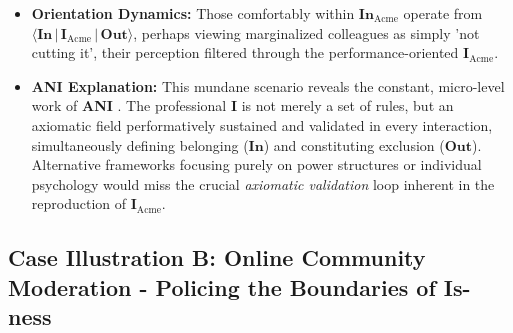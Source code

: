 \documentclass{article}
\newcommand{\ANI}{\textbf{ANI}}             %
\newcommand{\Isness}{\mathbf{I}}            %
\newcommand{\Inness}{\mathbf{In}}           %
\newcommand{\Outness}{\mathbf{Out}}         %
\newcommand{\orientation}[3]{\ensuremath{\langle #1 \,|\, #2 \,|\, #3 \rangle}} %
\begin{document}
\begin{itemize}
    \item \textbf{Orientation Dynamics:} Those comfortably within $\Inness_{\text{Acme}}$ operate from $\orientation{\Inness}{\Isness_{\text{Acme}}}{\Outness}$, perhaps viewing marginalized colleagues as simply 'not cutting it', their perception filtered through the performance-oriented $\Isness_{\text{Acme}}$.
    \item \textbf{ANI Explanation:} This mundane scenario reveals the constant, micro-level work of \ANI{} \citep{Goffman1959}. The professional $\Isness$ is not merely a set of rules, but an axiomatic field performatively sustained and validated in every interaction, simultaneously defining belonging ($\Inness$) and constituting exclusion ($\Outness$). Alternative frameworks focusing purely on power structures or individual psychology would miss the crucial \textit{axiomatic validation} loop inherent in the reproduction of $\Isness_{\text{Acme}}$.
\end{itemize}

\subsection{Case Illustration B: Online Community Moderation - Policing the Boundaries of Is-ness}
\end{document}
